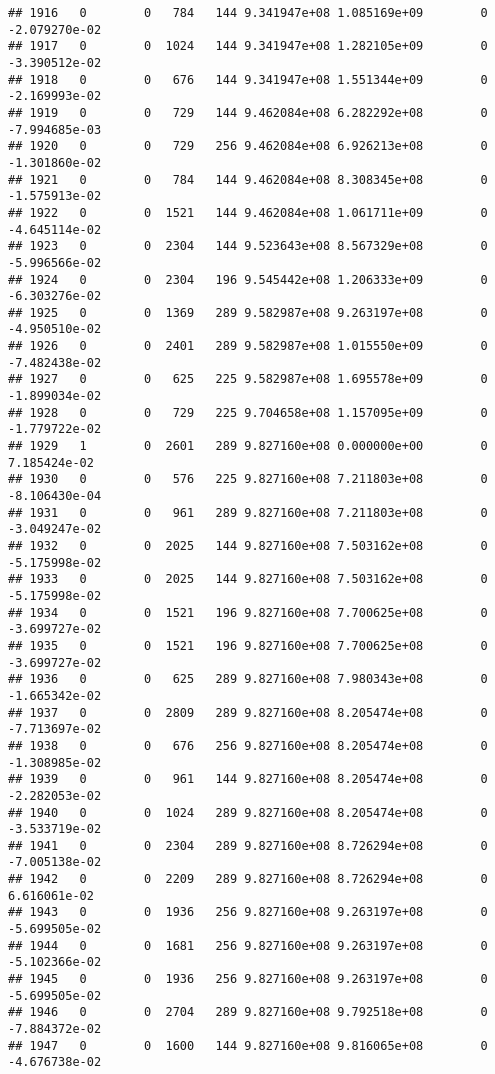 \documentclass[
]{article}
\begin{document}
\begin{enumerate}
\begin{verbatim}
## 1916   0        0   784   144 9.341947e+08 1.085169e+09        0 -2.079270e-02
## 1917   0        0  1024   144 9.341947e+08 1.282105e+09        0 -3.390512e-02
## 1918   0        0   676   144 9.341947e+08 1.551344e+09        0 -2.169993e-02
## 1919   0        0   729   144 9.462084e+08 6.282292e+08        0 -7.994685e-03
## 1920   0        0   729   256 9.462084e+08 6.926213e+08        0 -1.301860e-02
## 1921   0        0   784   144 9.462084e+08 8.308345e+08        0 -1.575913e-02
## 1922   0        0  1521   144 9.462084e+08 1.061711e+09        0 -4.645114e-02
## 1923   0        0  2304   144 9.523643e+08 8.567329e+08        0 -5.996566e-02
## 1924   0        0  2304   196 9.545442e+08 1.206333e+09        0 -6.303276e-02
## 1925   0        0  1369   289 9.582987e+08 9.263197e+08        0 -4.950510e-02
## 1926   0        0  2401   289 9.582987e+08 1.015550e+09        0 -7.482438e-02
## 1927   0        0   625   225 9.582987e+08 1.695578e+09        0 -1.899034e-02
## 1928   0        0   729   225 9.704658e+08 1.157095e+09        0 -1.779722e-02
## 1929   1        0  2601   289 9.827160e+08 0.000000e+00        0  7.185424e-02
## 1930   0        0   576   225 9.827160e+08 7.211803e+08        0 -8.106430e-04
## 1931   0        0   961   289 9.827160e+08 7.211803e+08        0 -3.049247e-02
## 1932   0        0  2025   144 9.827160e+08 7.503162e+08        0 -5.175998e-02
## 1933   0        0  2025   144 9.827160e+08 7.503162e+08        0 -5.175998e-02
## 1934   0        0  1521   196 9.827160e+08 7.700625e+08        0 -3.699727e-02
## 1935   0        0  1521   196 9.827160e+08 7.700625e+08        0 -3.699727e-02
## 1936   0        0   625   289 9.827160e+08 7.980343e+08        0 -1.665342e-02
## 1937   0        0  2809   289 9.827160e+08 8.205474e+08        0 -7.713697e-02
## 1938   0        0   676   256 9.827160e+08 8.205474e+08        0 -1.308985e-02
## 1939   0        0   961   144 9.827160e+08 8.205474e+08        0 -2.282053e-02
## 1940   0        0  1024   289 9.827160e+08 8.205474e+08        0 -3.533719e-02
## 1941   0        0  2304   289 9.827160e+08 8.726294e+08        0 -7.005138e-02
## 1942   0        0  2209   289 9.827160e+08 8.726294e+08        0  6.616061e-02
## 1943   0        0  1936   256 9.827160e+08 9.263197e+08        0 -5.699505e-02
## 1944   0        0  1681   256 9.827160e+08 9.263197e+08        0 -5.102366e-02
## 1945   0        0  1936   256 9.827160e+08 9.263197e+08        0 -5.699505e-02
## 1946   0        0  2704   289 9.827160e+08 9.792518e+08        0 -7.884372e-02
## 1947   0        0  1600   144 9.827160e+08 9.816065e+08        0 -4.676738e-02

\end{verbatim}
\end{enumerate}
\end{document}
